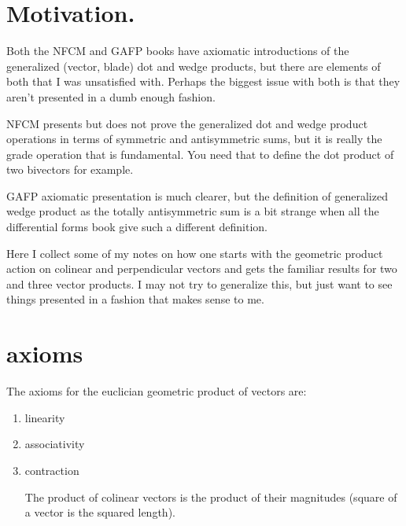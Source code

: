 \documentclass{article}      %
\title{} %
\author{Peeter Joot}         %
\begin{document}

\maketitle{}

\section{ Motivation. }

Both the NFCM and GAFP books have axiomatic introductions of the 
generalized (vector, blade) dot and wedge products, but there are
elements of both that I was unsatisfied with.  Perhaps the biggest
issue with both is that they aren't presented in a dumb enough fashion.

NFCM presents but
does not prove the generalized dot and wedge product operations
in terms of symmetric and antisymmetric sums, but it is really the
grade operation that is fundamental.  You need that to define the
dot product of two bivectors for example.

GAFP axiomatic presentation is much clearer, but the definition of
generalized wedge product as the totally antisymmetric sum is a bit
strange when all the differential forms book give such a different
definition.

Here I collect some of my notes on how one starts with the geometric
product action on colinear and perpendicular vectors and gets the 
familiar results for two and three vector products.  I may not try to
generalize this, but just want to see things presented in a fashion
that makes sense to me.

\section{ axioms }

The axioms for the euclician geometric product of vectors are:

\begin{enumerate}
\item{ linearity }
\item{ associativity }
\item{ contraction }

The product of colinear vectors is the product of their magnitudes
(square of a vector is the squared length).
\end{enumerate}

\end{document}
